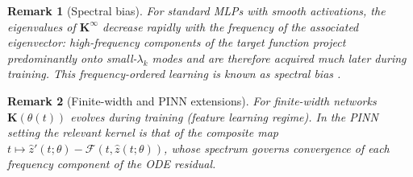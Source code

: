 \documentclass{article}
\newtheorem{remark}{Remark}
\begin{document}
\begin{remark}[Spectral bias]
    For standard MLPs with smooth activations, the eigenvalues of
    $\mathbf{K}^{\infty}$ decrease rapidly with the frequency of the
    associated eigenvector: high-frequency components of the target function
    project predominantly onto small-$\lambda_k$ modes and are therefore
    acquired much later during training.  This frequency-ordered learning is
    known as \emph{spectral bias} \cite{rahaman2019}.
\end{remark}

\begin{remark}[Finite-width and PINN extensions]
    For finite-width networks $\mathbf{K}(\theta(t))$ evolves during training
    (feature learning regime).  In the PINN setting the relevant kernel is
    that of the composite map $t\mapsto\hat{z}'(t;\theta)-
    \mathcal{F}(t,\hat{z}(t;\theta))$, whose spectrum governs convergence of
    each frequency component of the ODE residual.
\end{remark}
\end{document}

